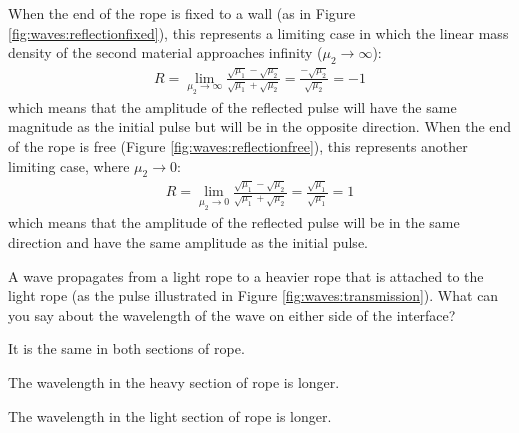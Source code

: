 When the end of the rope is fixed to a wall (as in Figure \ref{fig:waves:reflectionfixed}), this represents a limiting case in which the linear mass density of the second material approaches infinity ($\mu_2 \rightarrow \infty$):
\begin{align*}
R=\lim_{\mu_2\to \infty}\frac{\sqrt{\mu_1}-\sqrt{\mu_2}}{\sqrt{\mu_1}+\sqrt{\mu_2}}=\frac{-\sqrt{\mu_2}}{\sqrt{\mu_2}}=-1
\end{align*}
which means that the amplitude of the reflected pulse will have the same magnitude as the initial pulse but will be in the opposite direction. When the end of the rope is free (Figure \ref{fig:waves:reflectionfree}), this represents another limiting case, where $\mu_2\rightarrow 0$:
\begin{align*}
R=\lim_{\mu_2\to 0}\frac{\sqrt{\mu_1}-\sqrt{\mu_2}}{\sqrt{\mu_1}+\sqrt{\mu_2}}=\frac{\sqrt{\mu_1}}{\sqrt{\mu_1}}=1
\end{align*}
which means that the amplitude of the reflected pulse will be in the same direction  and have the same amplitude as the initial pulse. 


\begin{checkpoint}
\begin{MCquestion}{A wave propagates from a light rope to a heavier rope that is attached to the light rope (as the pulse illustrated in Figure \ref{fig:waves:transmission}). What can you say about the wavelength of the wave on either side of the interface?}
\item It is the same in both sections of rope.
\item The wavelength in the heavy section of rope is longer.
\item The wavelength in the light section of rope is longer.\correct
\end{MCquestion}
\end{checkpoint}

